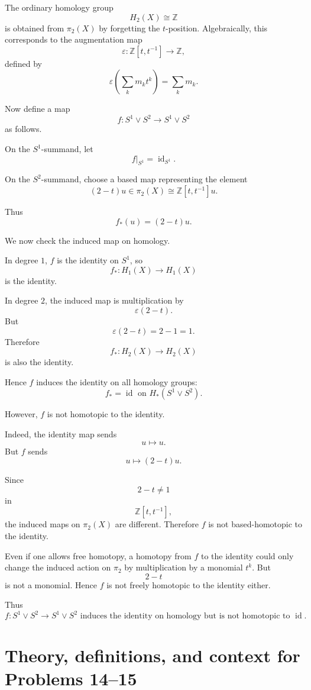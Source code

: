 \documentclass[12pt,a4paper]{article}
\theoremstyle{notespace}
\begin{document}
The ordinary homology group
\[
H_2(X)\cong \mathbb Z
\]
is obtained from \(\pi_2(X)\) by forgetting the \(t\)-position. Algebraically, this corresponds to the augmentation map
\[
\varepsilon:\mathbb Z[t,t^{-1}]\to \mathbb Z,
\]
defined by
\[
\varepsilon\left(\sum_k m_k t^k\right)
=
\sum_k m_k.
\]

Now define a map
\[
f:S^1\vee S^2\to S^1\vee S^2
\]
as follows.

On the \(S^1\)-summand, let
\[
f|_{S^1}=\operatorname{id}_{S^1}.
\]

On the \(S^2\)-summand, choose a based map representing the element
\[
(2-t)u\in \pi_2(X)\cong \mathbb Z[t,t^{-1}]u.
\]

Thus
\[
f_*(u)=(2-t)u.
\]

We now check the induced map on homology.

In degree \(1\), \(f\) is the identity on \(S^1\), so
\[
f_*:H_1(X)\to H_1(X)
\]
is the identity.

In degree \(2\), the induced map is multiplication by
\[
\varepsilon(2-t).
\]
But
\[
\varepsilon(2-t)=2-1=1.
\]
Therefore
\[
f_*:H_2(X)\to H_2(X)
\]
is also the identity.

Hence \(f\) induces the identity on all homology groups:
\[
\boxed{
	f_*=\operatorname{id}
	\text{ on }H_*(S^1\vee S^2).
}
\]

However, \(f\) is not homotopic to the identity.

Indeed, the identity map sends
\[
u\mapsto u.
\]
But \(f\) sends
\[
u\mapsto (2-t)u.
\]

Since
\[
2-t\neq 1
\]
in
\[
\mathbb Z[t,t^{-1}],
\]
the induced maps on \(\pi_2(X)\) are different. Therefore \(f\) is not based-homotopic to the identity.

Even if one allows free homotopy, a homotopy from \(f\) to the identity could only change the induced action on \(\pi_2\) by multiplication by a monomial \(t^k\). But
\[
2-t
\]
is not a monomial. Hence \(f\) is not freely homotopic to the identity either.

Thus
\[
\boxed{
	f:S^1\vee S^2\to S^1\vee S^2
	\text{ induces the identity on homology but is not homotopic to }
	\operatorname{id}.
}
\]

\section*{Theory, definitions, and context for Problems 14--15}
\end{document}
